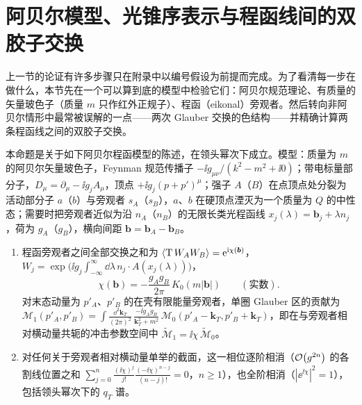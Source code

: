 \section{阿贝尔模型、光锥序表示与程函线间的双胶子交换}\label{sec:dy-model}

上一节的论证有许多步骤只在附录中以编号假设为前提而完成。为了看清每一步在做什么，本节先在一个可以算到底的模型中检验它们：阿贝尔规范理论、有质量的矢量玻色子（质量 $m$ 只作红外正规子）、程函（eikonal）旁观者。然后转向非阿贝尔情形中最常被误解的一点——两次 Glauber 交换的色结构——并精确计算两条程函线之间的双胶子交换。

\begin{proposition}\label{prop:dy-abelian-model}
本命题是关于如下阿贝尔程函模型的陈述，在领头幂次下成立。模型：质量为 $m$ 的阿贝尔矢量玻色子，Feynman 规范传播子 $-\ii g_{\mu\nu}/(k^2-m^2+\ii0)$；带电标量部分子，$D_\mu=\partial_\mu-\ii g_jA_\mu$，顶点 $+\ii g_j(p+p')^\mu$；强子 $A$（$B$）在点顶点处分裂为活动部分子 $a$（$b$）与旁观者 $s_A$（$s_B$），$a$、$b$ 在硬顶点湮灭为一个质量为 $Q$ 的中性态；需要时把旁观者近似为沿 $n_A$（$n_B$）的无限长类光程函线 $x_j(\lambda)=\boldsymbol b_j+\lambda n_j$，荷为 $g_A$（$g_B$），横向间距 $\boldsymbol b=\boldsymbol b_A-\boldsymbol b_B$。
\begin{enumerate}[label=(G-\roman*),leftmargin=3em,itemsep=1pt,topsep=2pt]
\item 程函旁观者之间全部交换之和为 $\langle{\rm T}\,W_AW_B\rangle=\mathrm{e}^{\mathrm{i}\chi(\boldsymbol b)}$，$W_j=\exp\big(\ii g_j\int_{-\infty}^\infty\dd\lambda\,n_j\cdot A(x_j(\lambda))\big)$，
\begin{equation}\label{eq:dy-chi}
\chi(\boldsymbol b)=-\frac{g_Ag_B}{2\pi}\,K_0(m|\boldsymbol b|)\qquad(\text{实数}).
\end{equation}
对末态动量为 $p'_A$、$p'_B$ 的在壳有限能量旁观者，单圈 Glauber 区的贡献为
$\mathcal M_1(p'_A,p'_B)=\int\frac{\dd^2\mathbf k_T}{(2\pi)^2}\,\frac{-\ii g_Ag_B}{\mathbf k_T^2+m^2}\,\mathcal M_0(p'_A-\mathbf k_T,p'_B+\mathbf k_T)$，即在与旁观者相对横动量共轭的冲击参数空间中 $\tilde{\mathcal M}_1=\ii\chi\,\tilde{\mathcal M}_0$。
\item 对任何关于旁观者相对横动量单举的截面，这一相位逐阶相消（$\mathcal{O}\!\left(g^{2n}\right)$ 的各割线位置之和 $\sum_{j=0}^n\frac{(\ii\chi)^j}{j!}\frac{(-\ii\chi)^{n-j}}{(n-j)!}=0$，$n\ge1$），也全阶相消（$|\ee^{\ii\chi}|^2=1$），包括领头幂次下的 $q_T$ 谱。

\end{enumerate}
\end{proposition}
